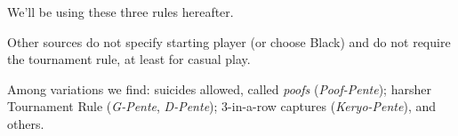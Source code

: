 \documentclass[12pt,a4paper,notitlepage]{article}
\begin{document}
We'll be using these three rules hereafter.

Other sources do not specify starting player (or choose Black) and do not require the tournament rule, at least for casual play. 

Among variations we find: suicides allowed, called \textit{poofs} (\textit{Poof-Pente}); harsher Tournament Rule (\textit{G-Pente}, \textit{D-Pente}); 3-in-a-row captures (\textit{Keryo-Pente}), and others.\supercite{pente-org,pente-net}

\printbibliography
\end{document}
